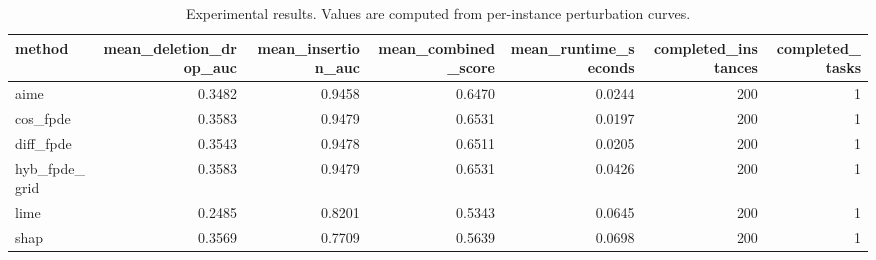 \begin{table}[t]
\caption{Experimental results. Values are computed from per-instance perturbation curves.}
\label{tab:main_results_computed}
\centering
\begin{tabular}{lrrrrrr}
\toprule
method & mean\_deletion\_drop\_auc & mean\_insertion\_auc & mean\_combined\_score & mean\_runtime\_seconds & completed\_instances & completed\_tasks \\
\midrule
aime & 0.3482 & 0.9458 & 0.6470 & 0.0244 & 200 & 1 \\
cos\_fpde & 0.3583 & 0.9479 & 0.6531 & 0.0197 & 200 & 1 \\
diff\_fpde & 0.3543 & 0.9478 & 0.6511 & 0.0205 & 200 & 1 \\
hyb\_fpde\_grid & 0.3583 & 0.9479 & 0.6531 & 0.0426 & 200 & 1 \\
lime & 0.2485 & 0.8201 & 0.5343 & 0.0645 & 200 & 1 \\
shap & 0.3569 & 0.7709 & 0.5639 & 0.0698 & 200 & 1 \\
\bottomrule
\end{tabular}

\end{table}
